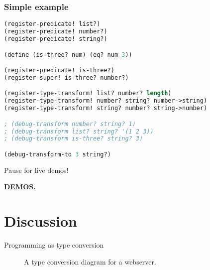 \documentclass[11pt]{beamer}
\begin{document}
\begin{frame}[fragile]
\frametitle{Simple example}

\begin{lstlisting}[language=lisp]
(register-predicate! list?)
(register-predicate! number?)
(register-predicate! string?)

(define (is-three? num) (eq? num 3))

(register-predicate! is-three?)
(register-super! is-three? number?)

(register-type-transform! list? number? length)
(register-type-transform! number? string? number->string)
(register-type-transform! string? number? string->number)

; (debug-transform number? string? 1)
; (debug-transform list? string? '(1 2 3))
; (debug-transform is-three? string? 3)

(debug-transform-to 3 string?)
\end{lstlisting}

\end{frame}

\begin{frame}{Pause for live demos!}

\begin{center} \Huge \textbf{DEMOS.} \end{center}

\end{frame}

\section{Discussion}

\begin{frame}{Programming as type conversion}
    \begin{figure}[h!]
        \centering

        \resizebox{10cm}{!} {
          
        }

        \caption{A type conversion diagram for a webserver.}
    \end{figure}
\end{frame}
\end{document}
